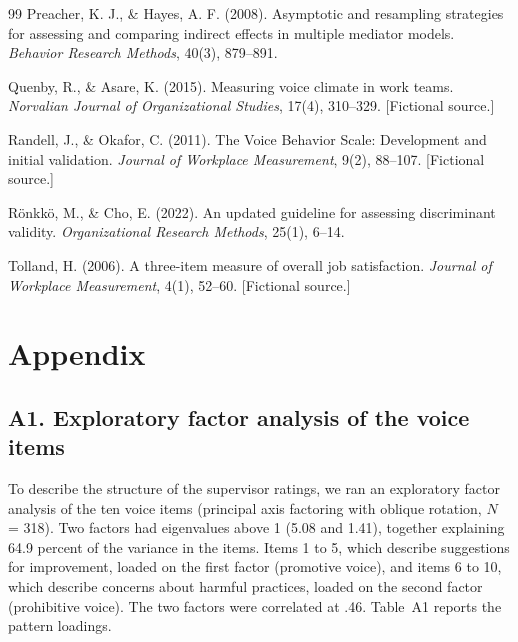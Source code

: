 \documentclass[11pt]{article}
\begin{document}
\begin{thebibliography}{99}
Preacher, K. J., \& Hayes, A. F. (2008). Asymptotic and resampling strategies for assessing and comparing indirect effects in multiple mediator models. \textit{Behavior Research Methods}, 40(3), 879--891.

Quenby, R., \& Asare, K. (2015). Measuring voice climate in work teams. \textit{Norvalian Journal of Organizational Studies}, 17(4), 310--329. [Fictional source.]

Randell, J., \& Okafor, C. (2011). The Voice Behavior Scale: Development and initial validation. \textit{Journal of Workplace Measurement}, 9(2), 88--107. [Fictional source.]

R\"onkk\"o, M., \& Cho, E. (2022). An updated guideline for assessing discriminant validity. \textit{Organizational Research Methods}, 25(1), 6--14.

Tolland, H. (2006). A three-item measure of overall job satisfaction. \textit{Journal of Workplace Measurement}, 4(1), 52--60. [Fictional source.]

\end{thebibliography}

\clearpage
\appendix
\section*{Appendix}
\setcounter{table}{0}
\renewcommand{\thetable}{A\arabic{table}}
\renewcommand{\theHtable}{A\arabic{table}}

\subsection*{A1. Exploratory factor analysis of the voice items}

To describe the structure of the supervisor ratings, we ran an exploratory factor analysis of the ten voice items (principal axis factoring with oblique rotation, $N$ = 318). Two factors had eigenvalues above 1 (5.08 and 1.41), together explaining 64.9 percent of the variance in the items. Items 1 to 5, which describe suggestions for improvement, loaded on the first factor (promotive voice), and items 6 to 10, which describe concerns about harmful practices, loaded on the second factor (prohibitive voice). The two factors were correlated at .46. Table~A1 reports the pattern loadings.
\end{document}
